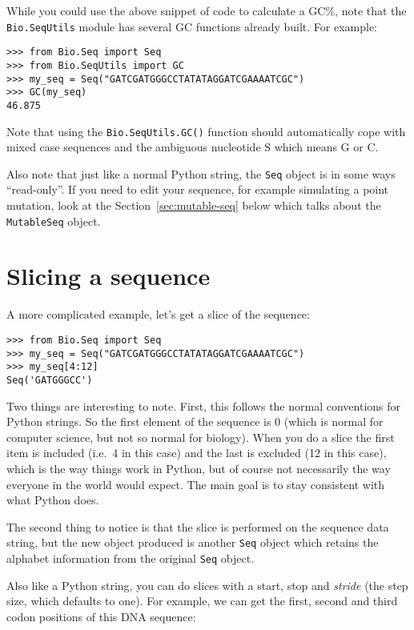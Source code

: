 While you could use the above snippet of code to calculate a GC\%, note that  the \verb|Bio.SeqUtils| module has several GC functions already built.  For example:

\begin{verbatim}
>>> from Bio.Seq import Seq
>>> from Bio.SeqUtils import GC
>>> my_seq = Seq("GATCGATGGGCCTATATAGGATCGAAAATCGC")
>>> GC(my_seq)
46.875
\end{verbatim}

\noindent Note that using the \verb|Bio.SeqUtils.GC()| function should automatically cope with mixed case sequences and the ambiguous nucleotide S which means G or C.

Also note that just like a normal Python string, the \verb|Seq| object is in some ways ``read-only''.  If you need to edit your sequence, for example simulating a point mutation, look at the Section~\ref{sec:mutable-seq} below which talks about the \verb|MutableSeq| object.

\section{Slicing a sequence}

A more complicated example, let's get a slice of the sequence:

\begin{verbatim}
>>> from Bio.Seq import Seq
>>> my_seq = Seq("GATCGATGGGCCTATATAGGATCGAAAATCGC")
>>> my_seq[4:12]
Seq('GATGGGCC')
\end{verbatim}

Two things are interesting to note. First, this follows the normal conventions for Python strings.  So the first element of the sequence is 0 (which is normal for computer science, but not so normal for biology). When you do a slice the first item is included (i.e.~4 in this case) and the last is excluded (12 in this case), which is the way things work in Python, but of course not necessarily the way everyone in the world would expect. The main goal is to stay consistent with what Python does.

The second thing to notice is that the slice is performed on the sequence data string, but the new object produced is another \verb|Seq| object which retains the alphabet information from the original \verb|Seq| object.

Also like a Python string, you can do slices with a start, stop and \emph{stride} (the step size, which defaults to one).  For example, we can get the first, second and third codon positions of this DNA sequence:

